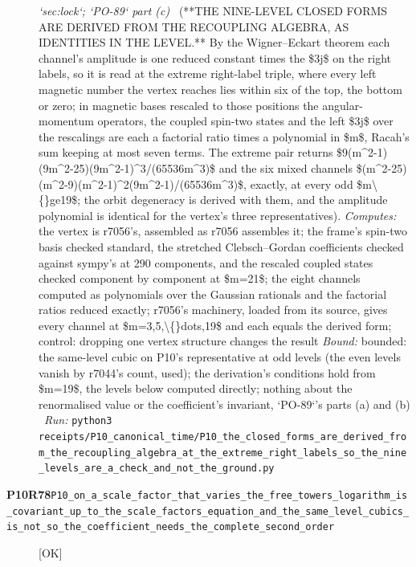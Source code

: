 \begin{description}
\textit{`sec:lock`; `PO-89` part (c)} \ (**THE NINE-LEVEL CLOSED FORMS ARE DERIVED FROM THE RECOUPLING ALGEBRA, AS IDENTITIES IN THE LEVEL.** By the Wigner--Eckart theorem each channel's amplitude is one reduced constant times the \$3j\$ on the right labels, so it is read at the extreme right-label triple, where every left magnetic number the vertex reaches lies within six of the top, the bottom or zero; in magnetic bases rescaled to those positions the angular-momentum operators, the coupled spin-two states and the left \$3j\$ over the rescalings are each a factorial ratio times a polynomial in \$m\$, Racah's sum keeping at most seven terms. The extreme pair returns \$9(m\textasciicircum{}2-1)(9m\textasciicircum{}2-25)(9m\textasciicircum{}2-1)\textasciicircum{}3/(65536m\textasciicircum{}3)\$ and the six mixed channels \$(m\textasciicircum{}2-25)(m\textasciicircum{}2-9)(m\textasciicircum{}2-1)\textasciicircum{}2(9m\textasciicircum{}2-1)/(65536m\textasciicircum{}3)\$, exactly, at every odd \$m\textbackslash\{\}ge19\$; the orbit degeneracy is derived with them, and the amplitude polynomial is identical for the vertex's three representatives). 
\emph{Computes:} the vertex is r7056's, assembled as r7056 assembles it; the frame's spin-two basis checked standard, the stretched Clebsch--Gordan coefficients checked against sympy's at 290 components, and the rescaled coupled states checked component by component at \$m=21\$; the eight channels computed as polynomials over the Gaussian rationals and the factorial ratios reduced exactly; r7056's machinery, loaded from its source, gives every channel at \$m=3,5,\textbackslash\{\}dots,19\$ and each equals the derived form; control: dropping one vertex structure changes the result
 \emph{Bound:} bounded: the same-level cubic on P10's representative at odd levels (the even levels vanish by r7044's count, used); the derivation's conditions hold from \$m=19\$, the levels below computed directly; nothing about the renormalised value or the coefficient's invariant, `PO-89`'s parts (a) and (b)
\ \emph{Run:} \texttt{python3 receipts/P10\_canonical\_time/P10\_the\_closed\_forms\_are\_derived\_from\_the\_recoupling\_algebra\_at\_the\_extreme\_right\_labels\_so\_the\_nine\_levels\_are\_a\_check\_and\_not\_the\_ground.py}
\item[\rcptlabel{P10_on_a_scale_factor_that_varies_the_free_towers_logarithm_is_covariant_up_to_the_scale_factors_equation_and_the_same_level_cubics_is_not_so_the_coefficient_needs_the_complete_second_order}{P10R78}\textbf{P10R78}\quad\texttt{P10\_on\_a\_scale\_factor\_that\_varies\_the\_free\_towers\_logarithm\_is\_covariant\_up\_to\_the\_scale\_factors\_equation\_and\_the\_same\_level\_cubics\_is\_not\_so\_the\_coefficient\_needs\_the\_complete\_second\_order}]\hfill\textsf{[OK]}\\

\end{description}
